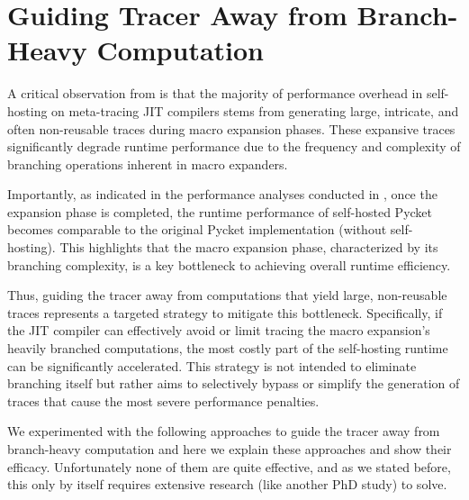 	\section[\texorpdfstring{Guiding Tracer Away from Branch-Heavy Computation}{Hot Branches}]{Guiding Tracer Away from Branch-Heavy Computation}
    \label{section:hot-branches}

    \begin{paragraph-here}%
      A critical observation from  is that the majority of performance overhead in self-hosting on meta-tracing JIT compilers stems from generating large, intricate, and often non-reusable traces during macro expansion phases. These expansive traces significantly degrade runtime performance due to the frequency and complexity of branching operations inherent in macro expanders.
    \end{paragraph-here}

    \begin{paragraph-here}%
      Importantly, as indicated in the performance analyses conducted in , once the expansion phase is completed, the runtime performance of self-hosted Pycket becomes comparable to the original Pycket implementation (without self-hosting). This highlights that the macro expansion phase, characterized by its branching complexity, is a key bottleneck to achieving overall runtime efficiency.
    \end{paragraph-here}

    \begin{paragraph-here}%
      Thus, guiding the tracer away from computations that yield large, non-reusable traces represents a targeted strategy to mitigate this bottleneck. Specifically, if the JIT compiler can effectively avoid or limit tracing the macro expansion's heavily branched computations, the most costly part of the self-hosting runtime can be significantly accelerated. This strategy is not intended to eliminate branching itself but rather aims to selectively bypass or simplify the generation of traces that cause the most severe performance penalties.
    \end{paragraph-here}

    \begin{paragraph-here}%
      We experimented with the following approaches to guide the tracer away from branch-heavy computation and here we explain these approaches and show their efficacy. Unfortunately none of them are quite effective, and as we stated before, this only by itself requires extensive research (like another PhD study) to solve.
    \end{paragraph-here}

